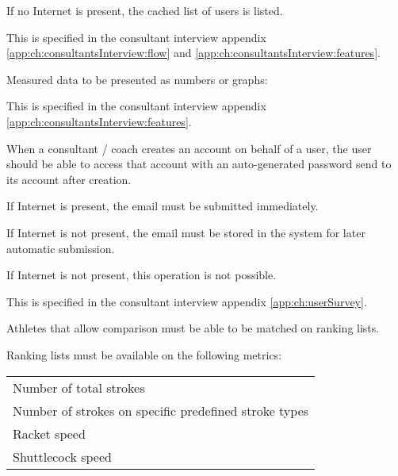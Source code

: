 If no Internet is present, the cached list of users is listed.


This  is specified in the consultant interview appendix \ref{app:ch:consultantsInterview:flow} and \ref{app:ch:consultantsInterview:features}.

Measured data to be presented as numbers or graphs: \newline
{}


This  is specified in the consultant interview appendix \ref{app:ch:consultantsInterview:features}.

When a consultant / coach creates an account on behalf of a user, the user should be able to access that account with an auto-generated password send to its account after creation.

If Internet is present, the email must be submitted immediately.

If Internet is not present, the email must be stored in the system for later automatic submission.


If Internet is not present, this operation is not possible.


This  is specified in the consultant interview appendix \ref{app:ch:userSurvey}.

Athletes that allow comparison must be able to be matched on ranking lists.

Ranking lists must be available on the following metrics: \newline
\begin{tabularx}{\textwidth}{X}
    Number of total strokes \\
    Number of strokes on specific predefined stroke types \\
    Racket speed \\
    Shuttlecock speed \\
\end{tabularx}

